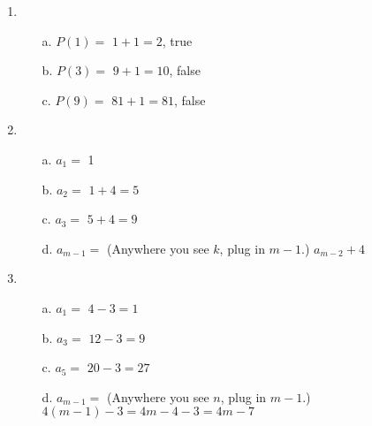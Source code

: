 
\newcommand{\laClass}       {CS 210}
\newcommand{\laSemester}    {Spring 2018}
\newcommand{\laChapter}     {2.3}
\newcommand{\laType}        {Exercise}
\newcommand{\laPoints}      {5}
\newcommand{\laTitle}       {Mathematical Induction}
\newcommand{\laDate}        {}
\setcounter{chapter}{2}
\setcounter{section}{3}
\addtocounter{section}{-1}

\toggletrue{answerkey}






    \begin{enumerate}
        \item   
            \begin{itemize}
                \item[a.] $P(1) = $ {$1+1 = 2$, true}{}
                \item[b.] $P(3) = $ {$9+1 = 10$, false}{}
                \item[c.] $P(9) = $ {$81+1 = 81$, false}{}
            \end{itemize}

        \item
            \begin{itemize}
                \item[a.] $a_{1} = $    {1}{}
                \item[b.] $a_{2} = $    {$1 + 4 = 5$}{}
                \item[c.] $a_{3} = $    {$5 + 4 = 9$}{}
                \item[d.] $a_{m-1} = $  (Anywhere you see $k$, plug in $m-1$.)
                {$a_{m-2} + 4$}{}
            \end{itemize}

        \item
            \begin{itemize}
                \item[a.] $a_{1} = $    {$4 - 3 = 1$}{}
                \item[b.] $a_{3} = $    {$12 - 3 = 9$}{}
                \item[c.] $a_{5} = $    {$20 - 3 = 27$}{}
                \item[d.] $a_{m-1} = $  (Anywhere you see $n$, plug in $m-1$.) \\
                {$4(m-1) - 3 = 4m -4 -3 = 4m-7$}{}
            \end{itemize}


\end{enumerate}
